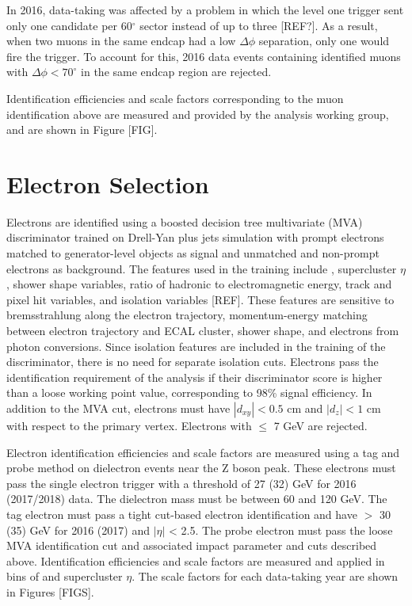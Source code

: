 In 2016, data-taking was affected by a problem in which the level one trigger sent only one candidate per 60$^{\circ}$ sector instead 
of up to three [REF?]. As a result, when two muons in the same endcap had a low $\Delta \phi$ separation, only one would fire the 
trigger. To account for this, 2016 data events containing identified muons with $\Delta \phi < 70^{\circ}$ in the same endcap region 
are rejected. 

Identification efficiencies and scale factors corresponding to the muon identification above are measured and provided by the 
\hzz analysis working group, and are shown in Figure [FIG].  

\section{Electron Selection}
Electrons are identified using a boosted decision tree multivariate (MVA) discriminator trained on Drell-Yan plus jets simulation 
with prompt electrons matched to generator-level objects as signal and unmatched and non-prompt electrons as background. The features 
used in the training include \pt, supercluster $\eta$, shower shape variables, ratio of hadronic to electromagnetic energy, track and 
pixel hit variables, and isolation variables [REF]. These features are sensitive to bremsstrahlung along the electron trajectory, 
momentum-energy matching between electron trajectory and ECAL cluster, shower shape, and electrons from photon conversions.
Since isolation features are included in the training of the discriminator, there is no need for separate isolation cuts. 
Electrons pass the identification requirement of the \hzg analysis if their discriminator score is higher than a loose working point 
value, corresponding to 98\% signal efficiency. In addition to the MVA cut, electrons must have $|d_{xy}| < 0.5$ cm and $|d_{z}| < 1$ cm
with respect to the primary vertex. Electrons with \pt $\leq$ 7 GeV are rejected. 

Electron identification efficiencies and scale factors are measured using a tag and probe method on dielectron events near the 
Z boson peak. These electrons must pass the single electron trigger with a \pt threshold of 27 (32) GeV for 2016 (2017/2018) data. 
The dielectron mass must be between 60 and 120 GeV. The tag electron must pass a tight cut-based electron identification and have 
\pt $>$ 30 (35) GeV for 2016 (2017) and $|\eta|$ < 2.5. The probe electron must pass the loose MVA identification cut and associated 
impact parameter and \pt cuts described above. Identification efficiencies and scale factors are measured and applied in bins of 
\pt and supercluster $\eta$. The scale factors for each data-taking year are shown in Figures [FIGS]. 

